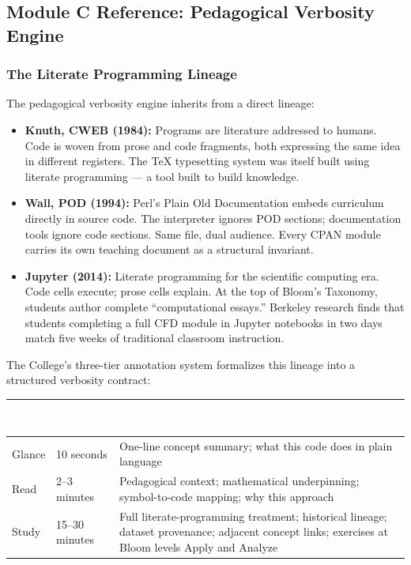 \documentclass[11pt,letterpaper]{article}
\newcommand{\tableheader}[1]{\textbf{\sffamily\textcolor{white}{#1}}}
\begin{document}
\subsection{Module C Reference: Pedagogical Verbosity Engine}

\subsubsection{The Literate Programming Lineage}

The pedagogical verbosity engine inherits from a direct lineage:

\begin{itemize}
  \item \textbf{Knuth, CWEB (1984):} Programs are literature addressed to humans. Code is woven from prose and code fragments, both expressing the same idea in different registers. The TeX typesetting system was itself built using literate programming --- a tool built to build knowledge.
  \item \textbf{Wall, POD (1994):} Perl's Plain Old Documentation embeds curriculum directly in source code. The interpreter ignores POD sections; documentation tools ignore code sections. Same file, dual audience. Every CPAN module carries its own teaching document as a structural invariant.
  \item \textbf{Jupyter (2014):} Literate programming for the scientific computing era. Code cells execute; prose cells explain. At the top of Bloom's Taxonomy, students author complete ``computational essays.'' Berkeley research finds that students completing a full CFD module in Jupyter notebooks in two days match five weeks of traditional classroom instruction.
\end{itemize}

The College's three-tier annotation system formalizes this lineage into a structured verbosity contract:

\begin{center}
\begin{tabularx}{\textwidth}{L{2cm}L{3cm}X}
\toprule
{}
\tableheader{Tier} & \tableheader{Reader Speed} & \tableheader{Content Specification} \\
\midrule
Glance & 10 seconds & One-line concept summary; what this code does in plain language \\
Read & 2--3 minutes & Pedagogical context; mathematical underpinning; symbol-to-code mapping; why this approach \\
Study & 15--30 minutes & Full literate-programming treatment; historical lineage; dataset provenance; adjacent concept links; exercises at Bloom levels Apply and Analyze \\
\bottomrule
\end{tabularx}
\end{center}
\end{document}
